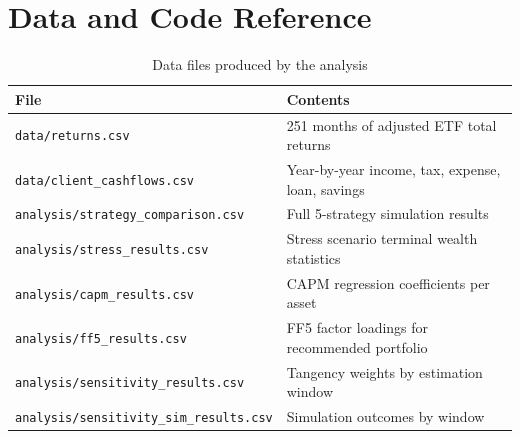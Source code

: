 \documentclass[12pt, letterpaper]{article}
\begin{document}
\section{Data and Code Reference}
\label{app:code}

\begin{table}[H]
  \centering
  \caption{Data files produced by the analysis}
  \label{tab:data}
  \begin{tabularx}{\linewidth}{lX}
    \toprule
    \textbf{File} & \textbf{Contents} \\
    \midrule
    \texttt{data/returns.csv}               & 251 months of adjusted ETF total returns \\
    \texttt{data/client\_cashflows.csv}     & Year-by-year income, tax, expense, loan, savings \\
    \texttt{analysis/strategy\_comparison.csv} & Full 5-strategy simulation results \\
    \texttt{analysis/stress\_results.csv}  & Stress scenario terminal wealth statistics \\
    \texttt{analysis/capm\_results.csv}    & CAPM regression coefficients per asset \\
    \texttt{analysis/ff5\_results.csv}     & FF5 factor loadings for recommended portfolio \\
    \texttt{analysis/sensitivity\_results.csv} & Tangency weights by estimation window \\
    \texttt{analysis/sensitivity\_sim\_results.csv} & Simulation outcomes by window \\
    \bottomrule
  \end{tabularx}
\end{table}
\end{document}
